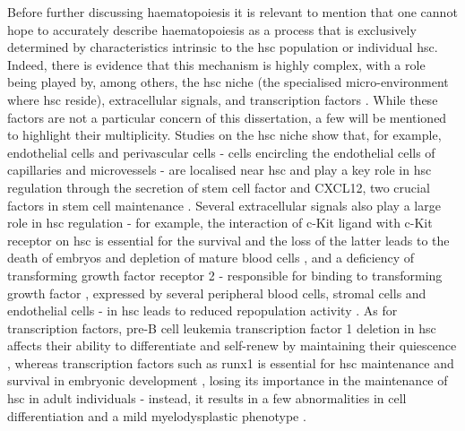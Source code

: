 Before further discussing haematopoiesis it is relevant to mention that one cannot hope to accurately describe haematopoiesis as a process that is exclusively determined by characteristics intrinsic to the \ac{hsc} population or individual \ac{hsc}. Indeed, there is evidence that this mechanism is highly complex, with a role being played by, among others, the \ac{hsc} niche (the specialised micro-environment where \ac{hsc} reside), extracellular signals, and transcription factors \cite{Wang2016-oq}. While these factors are not a particular concern of this dissertation, a few will be mentioned to highlight their multiplicity. Studies on the \ac{hsc} niche show that, for example, endothelial cells and perivascular cells - cells encircling the endothelial cells of capillaries and microvessels \cite{Crisan2012-nl} - are localised near \ac{hsc} \cite{Ding2012-hv,Zhou2014-fd} and play a key role in \ac{hsc} regulation through the secretion of stem cell factor and CXCL12, two crucial factors in stem cell maintenance \cite{Ding2012-hv,Sugiyama2006-vc,Greenbaum2013-rx}. Several extracellular signals also play a large role in \ac{hsc} regulation - for example, the interaction of c-Kit ligand with c-Kit receptor on \ac{hsc} is essential for the survival and the loss of the latter leads to the death of embryos and depletion of mature blood cells \cite{Huang1990-in}, and a deficiency of transforming growth factor \Beta{} receptor 2 - responsible for binding to transforming growth factor , expressed by several peripheral blood cells, stromal cells and endothelial cells \cite{Zhao2014-dv} - in \ac{hsc} leads to reduced repopulation activity \cite{Yamazaki2011-yv}. As for transcription factors, pre-B cell leukemia transcription factor 1 deletion in \ac{hsc} affects their ability to differentiate and self-renew by maintaining their quiescence \cite{Ficara2008-so}, whereas transcription factors such as \ac{runx1} is essential for \ac{hsc} maintenance and survival in embryonic development \cite{Okuda1996-rd}, losing its importance in the maintenance of \ac{hsc} in adult individuals \cite{Ichikawa2004-ow} - instead, it results in a few abnormalities in cell differentiation and a mild myelodysplastic phenotype \cite{Ichikawa2004-ow,Growney2005-zx}.

